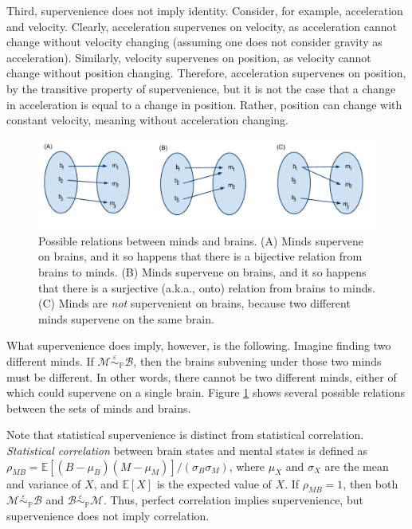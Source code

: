 \documentclass{article}
\newcommand{\mB}{\mathcal{B}}
\newcommand{\mM}{\mathcal{M}}
\newcommand{\PP}{\mathbb{P}}           %
\newcommand{\EE}{\mathbb{E}}           %
\newcommand{\sig}{\sigma}
\newcommand{\MeB}{\mM \overset{\varepsilon}{{\sim}}_{\PP} \mB}
\begin{document}
Third, supervenience does not imply identity.  Consider, for example, acceleration and velocity.  Clearly, acceleration supervenes on velocity, as acceleration cannot change without velocity changing (assuming one does not consider gravity as acceleration).  Similarly, velocity supervenes on position, as velocity cannot change without position changing.  Therefore, acceleration supervenes on position, by the transitive property of supervenience, but it is not the case that a change in acceleration is equal to a change in position.  Rather, position can change with constant velocity, meaning without acceleration changing.  

\begin{figure}[htbp]
	\centering
		\includegraphics[width=1\linewidth]{supervenience_relations.pdf}
	\caption{Possible relations between minds and brains.  (A) Minds supervene on brains, and it so happens that there is a bijective relation from brains to minds.  (B) Minds supervene on brains, and it so happens that there is a surjective (a.k.a., onto) relation from brains to minds. (C) Minds are \emph{not} supervenient on brains, because two different minds supervene on the same brain.}
	\label{fig:rel}
\end{figure}

What supervenience does imply, however, is the following.   Imagine finding two different minds.  If $\MeB$, then the brains subvening under those two minds must be different.  In other words, there cannot be two different minds, either of which could supervene on a single brain.  Figure \ref{fig:rel} shows several possible relations between the sets of minds and brains.


Note that statistical supervenience is distinct from statistical correlation.  \emph{Statistical correlation} between brain states and mental states is defined as $\rho_{MB}=\EE[(B-\mu_B)(M-\mu_M)]/(\sig_B \sig_M)$, where $\mu_X$ and $\sig_X$ are the mean and variance of $X$, and $\EE[X]$ is the expected value of $X$.  If $\rho_{MB}=1$, then both $\MeB$ and $\mB \overset{\varepsilon}{{\sim}}_{\PP} \mM$. Thus, perfect correlation implies supervenience, but supervenience does not imply correlation.  
\end{document}
